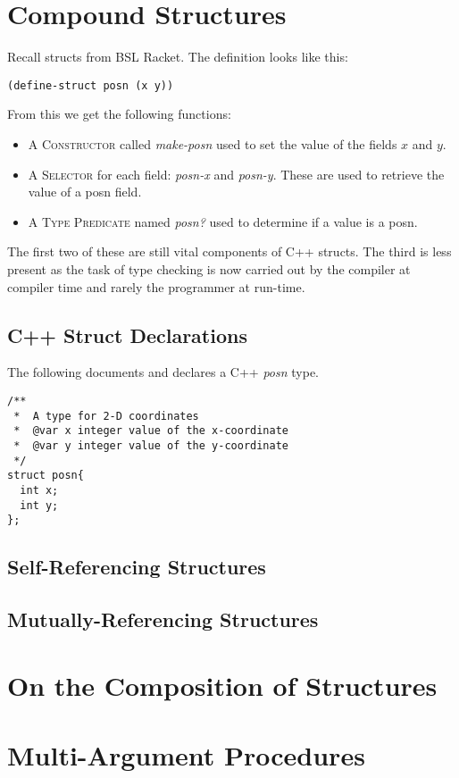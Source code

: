 \documentclass[]{tufte-handout}
\begin{document}
\section{Compound Structures}

Recall structs from BSL Racket. The definition looks like this: 
\begin{verbatim}
(define-struct posn (x y))
\end{verbatim}
From this we get the following functions:
\begin{itemize}
\item A \textsc{Constructor} called \textit{make-posn} used to set the value of the fields $x$ and $y$.
\item A \textsc{Selector} for each field: \textit{posn-x} and \textit{posn-y}. These are used to retrieve the value of a posn field.
\item A \textsc{Type Predicate} named \textit{posn?} used to determine if a value is a posn. 
\end{itemize}
The first two of these are still vital components of C++ structs. The third is less present as the task of type checking is now carried out by the compiler at compiler time and rarely the programmer at run-time. 


\subsection{C++ Struct Declarations}

The following documents and declares a C++ \textit{posn} type. 
\begin{verbatim}
/**
 *  A type for 2-D coordinates
 *  @var x integer value of the x-coordinate
 *  @var y integer value of the y-coordinate
 */
struct posn{
  int x;
  int y;
};
\end{verbatim}



\subsection{Self-Referencing Structures}


\subsection{Mutually-Referencing Structures}


\section{On the Composition of Structures}

\section{Multi-Argument Procedures}
\end{document}
